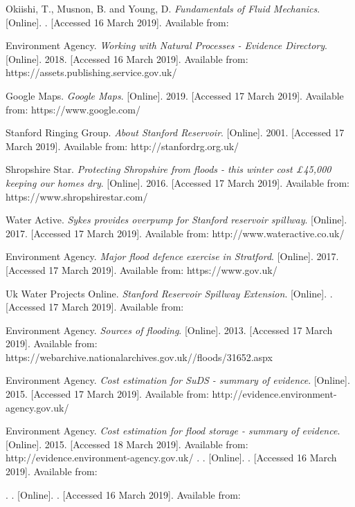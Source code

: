 \documentclass[11pt,a4paper]{article}
\begin{document}
\begin{thebibliography}{}
Okiishi, T., Musnon, B. and Young, D. \textit{Fundamentals of Fluid Mechanics}. [Online]. . [Accessed 16 March 2019]. Available from: 

Environment Agency. \textit{Working with Natural Processes - Evidence Directory}. [Online]. 2018. [Accessed 16 March 2019]. Available from: https://assets.publishing.service.gov.uk/

Google Maps. \textit{Google Maps}. [Online]. 2019. [Accessed 17 March 2019]. Available from: https://www.google.com/

Stanford Ringing Group. \textit{About Stanford Reservoir}. [Online]. 2001. [Accessed 17 March 2019]. Available from: http://stanfordrg.org.uk/

Shropshire Star. \textit{Protecting Shropshire from floods - this winter cost £45,000 keeping our homes dry}. [Online]. 2016. [Accessed 17 March 2019]. Available from: https://www.shropshirestar.com/

Water Active. \textit{Sykes provides overpump for Stanford reservoir spillway}. [Online]. 2017. [Accessed 17 March 2019]. Available from: http://www.wateractive.co.uk/

Environment Agency. \textit{Major flood defence exercise in Stratford}. [Online]. 2017. [Accessed 17 March 2019]. Available from: https://www.gov.uk/

Uk Water Projects Online. \textit{Stanford Reservoir Spillway Extension}. [Online]. . [Accessed 17 March 2019]. Available from:

Environment Agency. \textit{Sources of flooding}. [Online]. 2013. [Accessed 17 March 2019]. Available from: https://webarchive.nationalarchives.gov.uk//floods/31652.aspx

Environment Agency. \textit{Cost estimation for SuDS - summary of evidence}. [Online]. 2015. [Accessed 17 March 2019]. Available from: http://evidence.environment-agency.gov.uk/

Environment Agency. \textit{Cost estimation for flood storage - summary of evidence}. [Online]. 2015. [Accessed 18 March 2019]. Available from: http://evidence.environment-agency.gov.uk/
\bibitem{}
. \textit{}. [Online]. . [Accessed 16 March 2019]. Available from:

\bibitem{}
. \textit{}. [Online]. . [Accessed 16 March 2019]. Available from:
\end{thebibliography}
\end{document}
